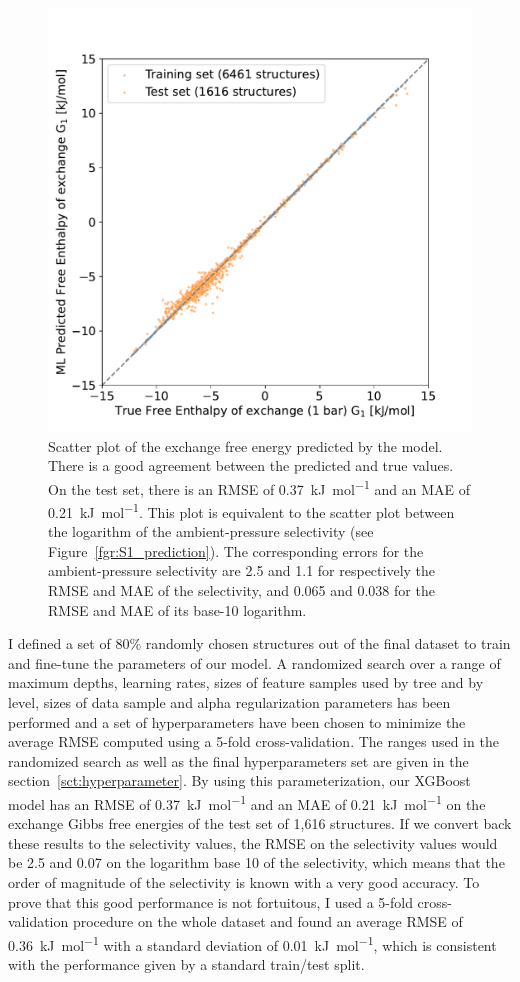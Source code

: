 \documentclass[main]{subfiles}
\begin{document}
\begin{figure}[ht]
\centering
  \includegraphics[width=0.5\linewidth]{figures/4-ml/main/Scatterplot_G1_prediction.pdf}
  \caption{Scatter plot of the exchange free energy predicted by the model. There is a good agreement between the predicted and true values. On the test set, there is an RMSE of \SI{0.37}{\kilo\joule\per\mole} and an MAE of \SI{0.21}{\kilo\joule\per\mole}. This plot is equivalent to the scatter plot between the logarithm of the ambient-pressure selectivity (see Figure~\ref{fgr:S1_prediction}). The corresponding errors for the ambient-pressure selectivity are 2.5 and 1.1 for respectively the RMSE and MAE of the selectivity, and 0.065 and 0.038 for the RMSE and MAE of its base-10 logarithm. }\label{fgr:G1_prediction}
\end{figure}

I defined a set of {80\%} randomly chosen structures out of the final dataset to train and fine-tune the parameters of our model. A randomized search over a range of maximum depths, learning rates, sizes of feature samples used by tree and by level, sizes of data sample and alpha regularization parameters has been performed and a set of hyperparameters have been chosen to minimize the average RMSE computed using a 5-fold cross-validation. The ranges used in the randomized search as well as the final hyperparameters set are given in the section~\ref{sct:hyperparameter}. By using this parameterization, our XGBoost model has an RMSE of \SI{0.37}{\kilo\joule\per\mole} and an MAE of \SI{0.21}{\kilo\joule\per\mole} on the exchange Gibbs free energies of the test set of 1,616 structures. If we convert back these results to the selectivity values, the RMSE on the selectivity values would be 2.5 and 0.07 on the logarithm base 10 of the selectivity, which means that the order of magnitude of the selectivity is known with a very good accuracy. To prove that this good performance is not fortuitous, I used a 5-fold cross-validation procedure on the whole dataset and found an average RMSE of \SI{0.36}{\kilo\joule\per\mole} with a standard deviation of \SI{0.01}{\kilo\joule\per\mole}, which is consistent with the performance given by a standard train/test split.
\end{document}
